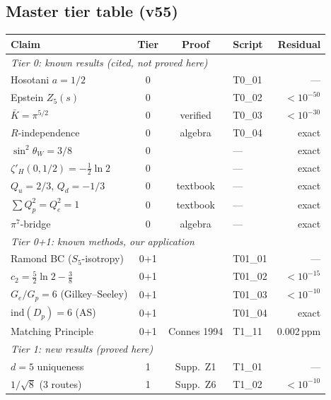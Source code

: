 \documentclass[11pt,a4paper]{article}
\begin{document}
\subsection*{Master tier table (v55)}

\begin{center}
\renewcommand{\arraystretch}{1.1}\footnotesize
\begin{tabular}{p{3.5cm}ccp{3cm}r}
\toprule
\textbf{Claim} & \textbf{Tier} & \textbf{Proof} & \textbf{Script} & \textbf{Residual}\\
\midrule
\multicolumn{5}{l}{\textit{Tier 0: known results (cited, not proved here)}}\\
\midrule
Hosotani $a{=}1/2$ & 0 & \cite{Hosotani1983} & T0\_01 & ---\\
Epstein $Z_5(s)$ & 0 & \cite{Epstein1903} & T0\_02 & $<10^{-50}$\\
$\bar K=\pi^{5/2}$ & 0 & verified & T0\_03 & $<10^{-30}$\\
$R$-independence & 0 & algebra & T0\_04 & exact\\
$\sin^2\theta_W{=}3/8$ & 0 & \cite{GeorgiGlashow1974} & --- & exact\\
$\zeta'_H(0,1/2){=}{-}\frac12\ln 2$ & 0 & \cite{Elizalde1995} & --- & exact\\
$Q_u{=}2/3$, $Q_d{=}{-}1/3$ & 0 & textbook & --- & exact\\
$\sum Q^2_p{=}Q^2_e{=}1$ & 0 & textbook & --- & exact\\
$\pi^7$-bridge & 0 & algebra & --- & exact\\
\midrule
\multicolumn{5}{l}{\textit{Tier 0+1: known methods, our application}}\\
\midrule
Ramond BC ($S_5$-isotropy) & 0{+}1 & \cite{LawsonMichelsohn1989} & T01\_01 & ---\\
$c_2{=}\frac52\ln 2{-}\frac38$ & 0{+}1 & \cite{Elizalde1995} & T01\_02 & $<10^{-15}$\\
$G_e/G_p{=}6$ (Gilkey--Seeley) & 0{+}1 & \cite{Gilkey1984} & T01\_03 & $<10^{-10}$\\
$\mathrm{ind}(D_p){=}6$ (AS) & 0{+}1 & \cite{AtiyahSinger1968} & T01\_04 & exact\\
Matching Principle & 0{+}1 & Connes 1994 & T1\_11 & 0.002\,ppm\\
\midrule
\multicolumn{5}{l}{\textit{Tier 1: new results (proved here)}}\\
\midrule
$d{=}5$ uniqueness & 1 & Supp.\ Z1 & T1\_01 & ---\\
$1/\!\sqrt{8}$ (3 routes) & 1 & Supp.\ Z6 & T1\_02 & $<10^{-10}$\\

\end{tabular}
\end{center}
\end{document}
